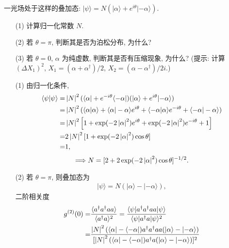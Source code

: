 \documentclass{assignment}
\begin{document}
\begin{prob}
    一光场处于这样的叠加态: $\lvert\psi\rangle=N(\lvert\alpha\rangle+e^{i\theta}\lvert-\alpha\rangle)$.
    \begin{itemize}
        \item[(1)] 计算归一化常数 $N$.
        \item[(2)] 若 $\theta=\pi$, 判断其是否为泊松分布, 为什么?
        \item[(3)] 若 $\theta=0$, $\alpha$ 为纯虚数, 判断其是否有压缩现象, 为什么? (提示: 计算 $(\Delta X_1)^2$, $X_1=(\alpha+\alpha^{\dagger})/2$, $X_2=(\alpha-\alpha^{\dagger})/2i$.)
    \end{itemize}
\end{prob}
\begin{sol}
    \begin{itemize}
        \item[(1)] 由归一化条件,
        \begin{align}
            \notag\langle\psi\vert\psi\rangle=&\left\lvert N\right\rvert^2(\langle\alpha\rvert+e^{-i\theta}\langle-\alpha\rvert)(\lvert\alpha\rangle+e^{i\theta}\lvert-\alpha\rangle)\\
            \notag=&\left\lvert N\right\rvert^2(\langle\alpha\vert\alpha\rangle+\langle\alpha\vert-\alpha\rangle e^{i\theta}+\langle-\alpha\vert\alpha\rangle e^{-i\theta}+\langle-\alpha\vert-\alpha\rangle)\\
            \notag=&\left\lvert N\right\rvert^2\left[1+\exp(-2\left\lvert\alpha\right\rvert^2)e^{i\theta}+\exp(-2\left\lvert\alpha\right\rvert^2)e^{-i\theta}+1\right]\\
            \notag=&2\left\lvert N\right\rvert^2[1+\exp(-2\left\lvert\alpha\right\rvert^2)\cos\theta]\\
            =&1,
        \end{align}
        \begin{align}
            \Longrightarrow N=[2+2\exp(-2\left\lvert\alpha\right\rvert^2)\cos\theta]^{-1/2}.
        \end{align}
        \item[(2)] 若 $\theta=\pi$, 则叠加态为
        \begin{align}
            \lvert\psi\rangle=N(\lvert\alpha\rangle-\lvert-\alpha\rangle),
        \end{align}
        二阶相关度
        \begin{align}
            \notag g^{(2)}(0)=&\frac{\langle a^{\dagger}a^{\dagger}aa\rangle}{\langle a^{\dagger}a\rangle^2}=\frac{\langle\psi\rvert a^{\dagger}a^{\dagger}aa\lvert\psi\rangle}{\langle\psi\rvert a^{\dagger}a\lvert\psi\rangle^2}\\
            \notag=&\frac{\abs{N}^2(\langle\alpha\rvert-\langle-\alpha\rvert)a^{\dagger}a^{\dagger}aa(\lvert\alpha\rangle-\lvert-\alpha\rangle)}{[\abs{N}^2(\langle\alpha\rvert-\langle-\alpha\rvert)a^{\dagger}a(\lvert\alpha\rangle-\lvert-\alpha\rangle)]^2}\\

\end{align}
\end{itemize}
\end{sol}
\end{document}
